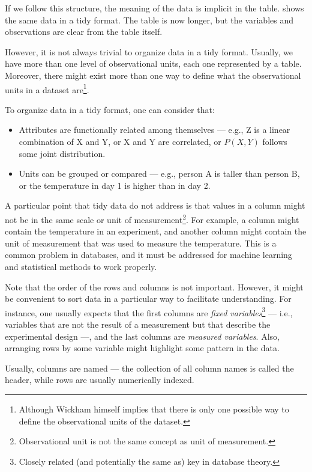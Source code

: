 If we follow this structure, the meaning of the data is implicit in the table.
 shows the same data in a tidy format.  The table is now longer, but
the variables and observations are clear from the table itself.

However, it is not always trivial to organize data in a tidy format.  Usually, we have
more than one level of observational units, each one represented by a table.  Moreover,
there might exist more than one way to define what the observational units in a dataset
are\footnote{Although Wickham himself implies that there is only one possible way to
define the observational units of the dataset.}.

To organize data in a tidy format, one can consider that:
\begin{itemize}
  \itemsep0em
  \item Attributes are functionally related among themselves --- e.g., Z is a linear
    combination of X and Y, or X and Y are correlated, or $P(X, Y)$ follows some joint distribution.
  \item Units can be grouped or compared --- e.g., person A is taller than person B, or
    the temperature in day 1 is higher than in day 2.
\end{itemize}

A particular point that tidy data do not address is that values in a column might not be
in the same scale or unit of measurement\footnote{Observational unit is not the same
concept as unit of measurement.}.  For example, a column might contain the
temperature in an experiment, and another column might contain the unit of measurement
that was used to measure the temperature.  This is a common problem in databases, and it
must be addressed for machine learning and statistical methods to work properly.

Note that the order of the rows and columns is not important.  However, it might be
convenient to sort data in a particular way to facilitate understanding.  For
instance, one usually expects that the first columns are \emph{fixed
variables}\footnote{Closely related (and potentially the same as) key in database
theory.} --- i.e., variables that are not the result of a measurement but that describe the
experimental design ---, and the last columns
are \emph{measured variables}.  Also, arranging rows by some variable might highlight some
pattern in the data.

Usually, columns are named --- the collection of all column names is called the
header, while rows are usually numerically indexed.

